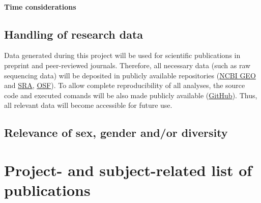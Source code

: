 \documentclass{scrartcl}
\begin{document}
\paragraph*{Time considerations}

\subsection{Handling of research data}
Data generated during this project will be used for scientific publications in
preprint and peer-reviewed journals. Therefore, all necessary data (such as raw
sequencing data) will be deposited in publicly available repositories
(\href{https://www.ncbi.nlm.nih.gov/geo/}{NCBI GEO} and
\href{https://www.ncbi.nlm.nih.gov/sra}{SRA}, \href{https://osf.io/}{OSF}). To
allow complete reproducibility of all analyses, the source code and executed
comands will be also made publicly available
(\href{https://github.com/}{GitHub}).  Thus, all relevant data will become
accessible for future use.

\subsection{Relevance of sex, gender and/or diversity}

\section{Project- and subject-related list of publications}
\label{sec:bib}
\end{document}
